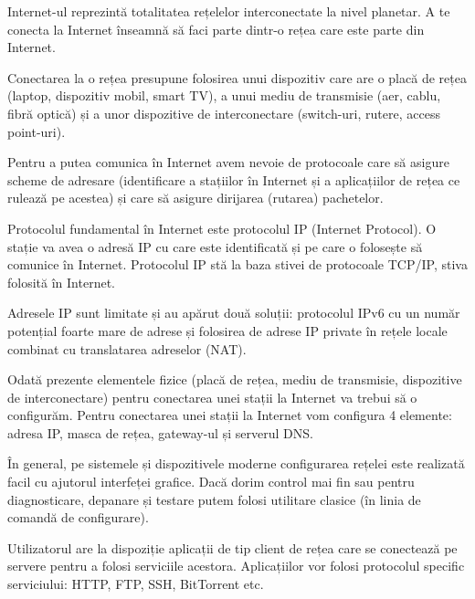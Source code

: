 Internet-ul reprezintă totalitatea rețelelor interconectate la nivel planetar. A te conecta la Internet înseamnă să faci parte dintr-o rețea care este parte din Internet.

Conectarea la o rețea presupune folosirea unui dispozitiv care are o placă de rețea (laptop, dispozitiv mobil, smart TV), a unui mediu de transmisie (aer, cablu, fibră optică) și a unor dispozitive de interconectare (switch-uri, rutere, access point-uri).

Pentru a putea comunica în Internet avem nevoie de protocoale care să asigure scheme de adresare (identificare a stațiilor în Internet și a aplicațiilor de rețea ce rulează pe acestea) și care să asigure dirijarea (rutarea) pachetelor.

Protocolul fundamental în Internet este protocolul IP (Internet Protocol). O stație va avea o adresă IP cu care este identificată și pe care o folosește să comunice în Internet. Protocolul IP stă la baza stivei de protocoale TCP/IP, stiva folosită în Internet.

Adresele IP sunt limitate și au apărut două soluții: protocolul IPv6 cu un număr potențial foarte mare de adrese și folosirea de adrese IP private în rețele locale combinat cu translatarea adreselor (NAT).

Odată prezente elementele fizice (placă de rețea, mediu de transmisie, dispozitive de interconectare) pentru conectarea unei stații la Internet va trebui să o configurăm. Pentru conectarea unei stații la Internet vom configura 4 elemente: adresa IP, masca de rețea, gateway-ul și serverul DNS.

În general, pe sistemele și dispozitivele moderne configurarea rețelei este realizată facil cu ajutorul interfeței grafice. Dacă dorim control mai fin sau pentru diagnosticare, depanare și testare putem folosi utilitare clasice (în linia de comandă de configurare).

Utilizatorul are la dispoziție aplicații de tip client de rețea care se conectează pe servere pentru a folosi serviciile acestora. Aplicațiilor vor folosi protocolul specific serviciului: HTTP, FTP, SSH, BitTorrent etc.
